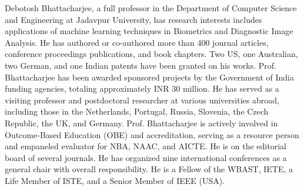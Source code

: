 \documentclass[a4paper,fleqn]{cas-dc}
\begin{document}
\vspace*{-1\baselineskip}

{\sloppy Debotosh Bhattacharjee, a full professor in the Department of Computer Science and Engineering at Jadavpur University, has research interests includes applications of machine learning techniques in Biometrics and Diagnostic Image Analysis. He has authored or co-authored more than 400 journal articles, conference proceedings publications, and book chapters.  Two US, one Australian, two German, and one Indian patents have been granted on his works. Prof. Bhattacharjee has been awarded sponsored projects by the Government of India funding agencies, totaling approximately INR 30 million. He has served as a visiting professor and postdoctoral researcher at various universities abroad, including those in the Netherlands, Portugal, Russia, Slovenia, the Czech Republic, the UK, and Germany. Prof. Bhattacharjee is actively involved in Outcome-Based Education (OBE) and accreditation, serving as a resource person and empaneled evaluator for NBA, NAAC, and AICTE. He is on the editorial board of several journals. He has organized nine international conferences as a general chair with overall responsibility. He is a Fellow of the WBAST, IETE, a Life Member of ISTE, and a Senior Member of IEEE (USA).\par}
\endbio
\end{document}
